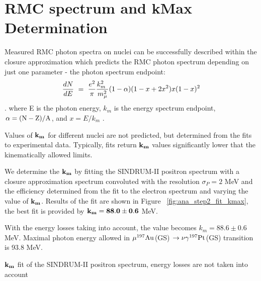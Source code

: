 \newpage
\section {RMC spectrum and kMax Determination}

Measured RMC photon spectra on nuclei can be successfully described within 
the closure approximation which predicts the RMC photon spectrum depending
on just one parameter - the photon spectrum endpoint:
$$
    {dN \over dE} ~=~ {e^2 \over \pi } {k_m^2 \ \over m_{\mu}^2} (1 - \alpha) (1-x+2x^2)x(1-x)^2
$$
. where E is the photon energy, $k_m$ is the energy spectrum endpoint, $\rm \alpha = (N-Z)/A$,
and $x = E/k_m$  \cite{Christillin_1980}.

Values of $\bf k_m$ for different nuclei are not predicted, but determined from the fits
to experimental data. Typically, fits return $\bf k_m$ values significantly lower that
the kinematically allowed limits.

We determine the $\bf k_m$ by fitting the SINDRUM-II positron spectrum with a closure approximation spectrum convoluted with the resolution $\sigma_P = 2$ MeV and the
efficiency determined from the fit to the electron spectrum and varying the value
of $\bf k_m$. Results of the fit are shown in Figure ~\ref{fig:ana_step2_fit_kmax},
the best fit is provided by $\bf k_m = 88.0 \pm 0.6$ MeV.

With the energy losses taking into account, the value becomes  $k_m = 88.6 \pm 0.6$ MeV.
Maximal photon energy allowed in  $\mu \mbox{$\rm ^{197}Au$}$(GS) $\rm \rightarrow \nu \gamma ^{197}Pt$(GS)
transition is 93.8 MeV.

\vspace{0.1in}
 {
  \label{fig:ana_step2_fit_kmax}
  $\bf k_m$ fit of the SINDRUM-II positron spectrum, energy losses are not
  taken into account
}
\vspace{0.1in}


